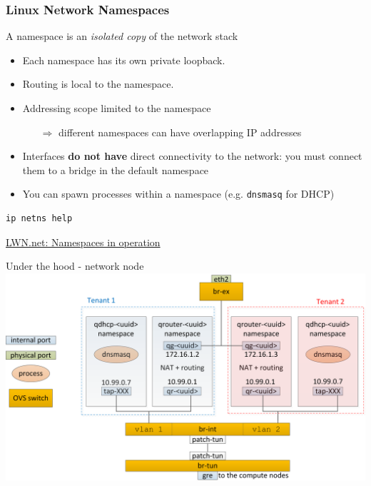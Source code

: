\documentclass[english,serif,mathserif,xcolor=pdftex,dvipsnames,table]{beamer}
\begin{document}
\begin{frame}[fragile]
  \frametitle{Linux Network Namespaces}
A namespace is an \textit{isolated copy} of the network stack

\begin{itemize}
\item Each namespace has its own private loopback.
\item Routing is local to the namespace.
\item Addressing scope limited to the namespace
  \begin{itemize}
  \item[$\Rightarrow$] different namespaces can have overlapping IP addresses
  \end{itemize}
\item Interfaces \textbf{do not have} direct connectivity to the
  network: you must connect them to a bridge in the default namespace
\item You can spawn processes within a namespace
  (e.g. \texttt{dnsmasq} for DHCP)
\end{itemize}

\footnotesize
\begin{verbatim}
ip netns help
\end{verbatim}
{\footnotesize\href{http://lwn.net/Articles/531114/}{LWN.net: Namespaces
    in operation}}
\end{frame}


\begin{frame}{Under the hood - network node}
  \includegraphics[width=\linewidth]{under-the-hood-neutron-server}
\end{frame}
\end{document}
